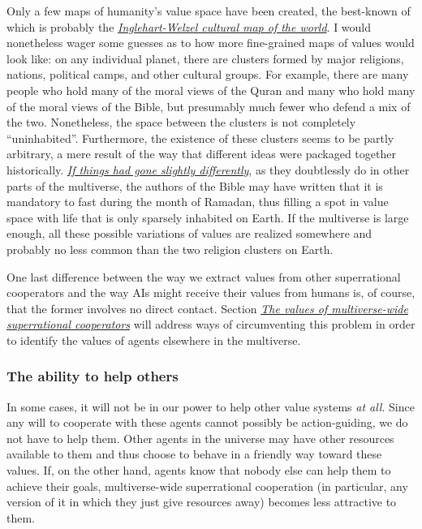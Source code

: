 Only a few maps of humanity's value space have been created, the
best-known of which is probably the
\href{https://en.wikipedia.org/wiki/Inglehart\%E2\%80\%93Welzel_cultural_map_of_the_world}{\emph{Inglehart-Welzel
cultural map of the world}}. I would nonetheless wager some guesses as
to how more fine-grained maps of values would look like: on any
individual planet, there are clusters formed by major religions,
nations, political camps, and other cultural groups. For example, there
are many people who hold many of the moral views of the Quran and many
who hold many of the moral views of the Bible, but presumably much fewer
who defend a mix of the two. Nonetheless, the space between the clusters
is not completely ``uninhabited''. Furthermore, the existence of these
clusters seems to be partly arbitrary, a mere result of the way that
different ideas were packaged together historically.
\href{https://en.wikipedia.org/wiki/Path_dependence}{\emph{If things had
gone slightly differently}}, as they doubtlessly do in other parts of
the multiverse, the authors of the Bible may have written that it is
mandatory to fast during the month of Ramadan, thus filling a spot in
value space with life that is only sparsely inhabited on Earth. If the
multiverse is large enough, all these possible variations of values are
realized somewhere and probably no less common than the two religion
clusters on Earth.

One last difference between the way we extract values from other
superrational cooperators and the way AIs might receive their values
from humans is, of course, that the former involves no direct contact.
Section \protect\hyperlink{_sm02dccw7h9m}{\emph{The values of
multiverse-wide superrational cooperators}} will address ways of
circumventing this problem in order to identify the values of agents
elsewhere in the multiverse.

\subsubsection{The ability to help
others}\label{the-ability-to-help-others}

In some cases, it will not be in our power to help other value systems
\emph{at all}. Since any will to cooperate with these agents cannot
possibly be action-guiding, we do not have to help them. Other agents in
the universe may have other resources available to them and thus choose
to behave in a friendly way toward these values. If, on the other hand,
agents know that nobody else can help them to achieve their goals,
multiverse-wide superrational cooperation (in particular, any version of
it in which they just give resources away) becomes less attractive to
them.

